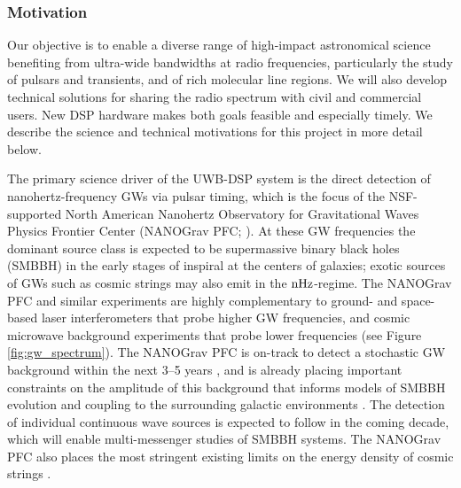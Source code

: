 \documentclass[10pt]{myNSF}
\begin{document}
\subsubsection{Motivation}
\label{sec:motivation}

Our objective is to enable a diverse range of high-impact astronomical
science benefiting from ultra-wide bandwidths at radio frequencies,
particularly the study of pulsars and transients, and of rich
molecular line regions.  We will also develop technical solutions for
sharing the radio spectrum with civil and commercial users.  New DSP
hardware makes both goals feasible and especially timely.  We describe
the science and technical motivations for this project in more detail
below.

\label{sec:science_motivation}

 The primary science driver
of the UWB-DSP system is the direct detection of nanohertz-frequency
GWs via pulsar timing, which is the focus of the NSF-supported North
American Nanohertz Observatory for Gravitational Waves Physics
Frontier Center (NANOGrav PFC; \cite{mcl13}).  At these GW frequencies
the dominant source class is expected to be supermassive binary black
holes (SMBBH) in the early stages of inspiral at the centers of
galaxies; exotic sources of GWs such as cosmic strings may also emit
in the $\textrm{nHz}$-regime.  The NANOGrav PFC and similar experiments are
highly complementary to ground- and space-based laser interferometers
that probe higher GW frequencies, and cosmic microwave background
experiments that probe lower frequencies (see Figure
\ref{fig:gw_spectrum}).  The NANOGrav PFC is on-track to detect a
stochastic GW background within the next 3--5 years \citep{tve+15},
and is already placing important constraints on the amplitude of this
background that informs models of SMBBH evolution and coupling to the
surrounding galactic environments \citep{abb+16,abb+18}.  The
detection of individual continuous wave sources is expected to follow
in the coming decade, which will enable multi-messenger studies of
SMBBH systems.  The NANOGrav PFC also places the most stringent
existing limits on the energy density of cosmic strings
\citep{abb+18}.
\end{document}
